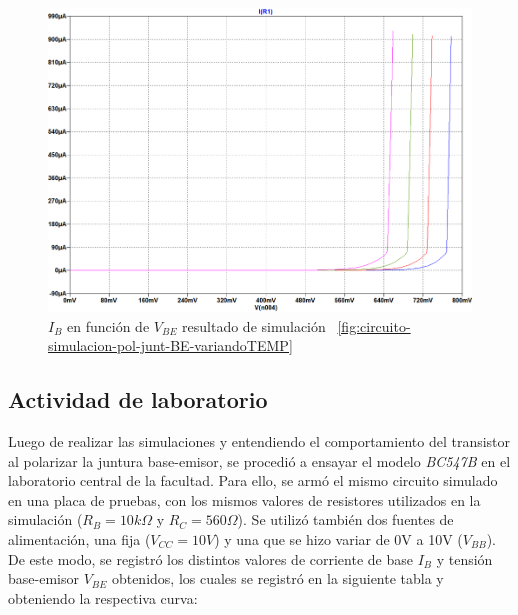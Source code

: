 \documentclass[chaptersright]{informeutn}
\begin{document}
    \begin{figure}[H]
        \centering
        \includegraphics[width=1\textwidth, keepaspectratio]{pictures/curva-simulacion-pol-junt-be-variandoTEMP.png}
        \caption{$I_B$ en función de $V_{BE}$ resultado de simulación 
        ~\ref{fig:circuito-simulacion-pol-junt-BE-variandoTEMP}}
    \end{figure}
    
    \subsection{Actividad de laboratorio}
    Luego de realizar las simulaciones y entendiendo el comportamiento del
    transistor al polarizar la juntura base-emisor, se procedió a ensayar el
    modelo \textit{BC547B} en el laboratorio central de la facultad. Para ello,
    se armó el mismo circuito simulado en una placa de pruebas, con los mismos
    valores de resistores utilizados en la simulación ($R_B = 10k\Omega$ y
    $R_C = 560\Omega$). Se utilizó también dos fuentes de alimentación, una fija
    ($V_{CC}=10V$) y una que se hizo variar de 0V a 10V ($V_{BB}$). De este modo,
    se registró los distintos valores de corriente de base $I_B$ y tensión
    base-emisor $V_{BE}$ obtenidos, los cuales se registró en la siguiente tabla
    y obteniendo la respectiva curva:
    
      \begin{center}
      \end{center}
\end{document}
